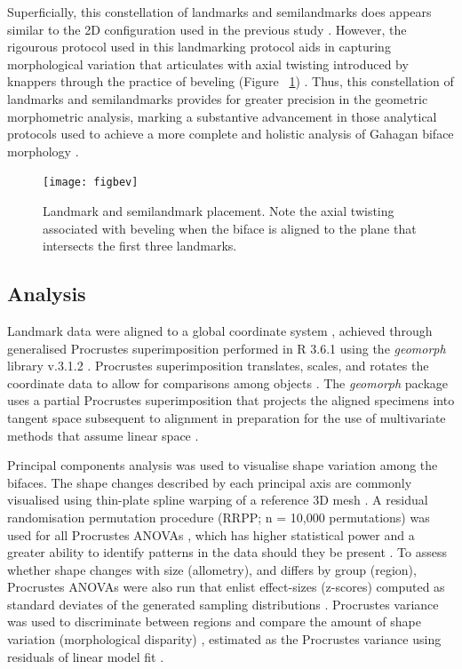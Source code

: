 \documentclass[review]{elsarticle}
\begin{document}
Superficially, this constellation of landmarks and semilandmarks does appears similar to the 2D configuration used in the previous study \citep{RN11783}. However, the rigourous protocol used in this landmarking protocol aids in capturing morphological variation that articulates with axial twisting introduced by knappers through the practice of beveling (Figure ~\ref{fig:fig5}) \citep{RN20850}. Thus, this constellation of landmarks and semilandmarks provides for greater precision in the geometric morphometric analysis, marking a substantive advancement in those analytical protocols used to achieve a more complete and holistic analysis of Gahagan biface morphology \citep{RN20850}.

\begin{figure}[h]\centering
\texttt{[image: figbev]}
\caption{Landmark and semilandmark placement. Note the axial twisting associated with beveling when the biface is aligned to the plane that intersects the first three landmarks.}
\label{fig:fig5}
\end{figure}

\subsection*{Analysis}

Landmark data were aligned to a global coordinate system \citep{RN11622,RN11623,RN11563}, achieved through generalised Procrustes superimposition \citep{RN478} performed in R 3.6.1 \citep{R} using the \textit{geomorph} library v.3.1.2 \citep{RN11530,RN1774}. Procrustes superimposition translates, scales, and rotates the coordinate data to allow for comparisons among objects \citep{RN11564,RN478}. The \textit{geomorph} package uses a partial Procrustes superimposition that projects the aligned specimens into tangent space subsequent to alignment in preparation for the use of multivariate methods that assume linear space \citep{RN1646,RN11563}.

Principal components analysis \citep{RN1746} was used to visualise shape variation among the bifaces. The shape changes described by each principal axis are commonly visualised using thin-plate spline warping of a reference 3D mesh \citep{RN1731,RN479}. A residual randomisation permutation procedure (RRPP; n = 10,000 permutations) was used for all Procrustes ANOVAs \citep{RN1655,RN11775}, which has higher statistical power and a greater ability to identify patterns in the data should they be present \citep{RN1719}. To assess whether shape changes with size (allometry), and differs by group (region), Procrustes ANOVAs \citep{RN1749} were also run that enlist effect-sizes (z-scores) computed as standard deviates of the generated sampling distributions \citep{RN1756}. Procrustes variance was used to discriminate between regions and compare the amount of shape variation (morphological disparity) \citep{RN11560}, estimated as the Procrustes variance using residuals of linear model fit \citep{RN11530}.
\end{document}
